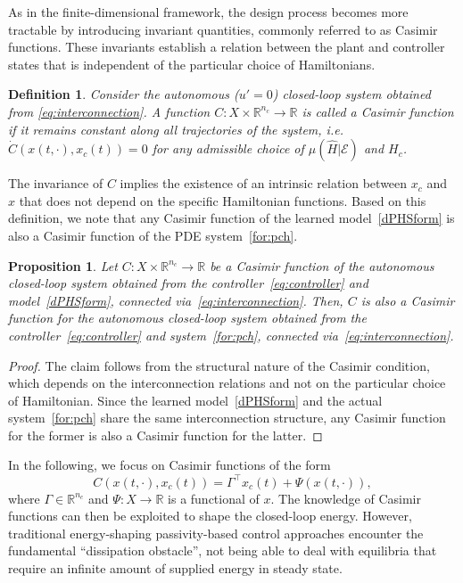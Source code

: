 \documentclass[letterpaper, 10 pt, conference]{ieeeconf}  %
\newcounter{part} %
\newtheorem{defn}{Definition}
\newtheorem{prop}{Proposition}
\begin{document}
As in the finite-dimensional framework, the design process becomes more tractable by introducing invariant quantities, commonly referred to as Casimir functions. These invariants establish a relation between the plant and controller states that is independent of the particular choice of Hamiltonians.

\begin{defn}
Consider the autonomous ($u' = 0$) closed-loop system obtained from \eqref{eq:interconnection}. A function $C \colon X \times \mathbb{R}^{n_c} \to \mathbb{R}$ is called a Casimir function if it remains constant along all trajectories of the system, i.e. $\dot{C}(x(t,\cdot), x_c(t)) = 0 $
for any admissible choice of $\mu(\hat{H}|\mathcal{E})$ and $H_c$.
\end{defn}


The invariance of $C$ implies the existence of an intrinsic relation between $x_c$ and $x$ that does not depend on the specific Hamiltonian functions. Based on this definition, we note that any Casimir function of the learned model~\cref{dPHSform} is also a Casimir function of the PDE system~\cref{for:pch}.
\begin{prop}\label{prop:1}
Let $C \colon X \times \mathbb{R}^{n_c} \to \mathbb{R}$ be a Casimir function of the autonomous closed-loop system obtained from the controller~\cref{eq:controller} and \textit{model}~\cref{dPHSform}, connected via~\eqref{eq:interconnection}. Then, $C$ is also a Casimir function for the autonomous closed-loop system obtained from the controller~\cref{eq:controller} and \textit{system}~\cref{for:pch}, connected via~\eqref{eq:interconnection}.
\end{prop}
\begin{proof}
The claim follows from the structural nature of the Casimir condition, which depends on the interconnection relations and not on the particular choice of Hamiltonian. Since the learned model~\cref{dPHSform} and the actual system~\cref{for:pch} share the same interconnection structure, any Casimir function for the former is also a Casimir function for the latter.
\end{proof}
In the following, we focus on Casimir functions of the form
\begin{equation}
C(x(t,\cdot), x_c(t)) = \Gamma^\top x_c(t) + \Psi(x(t,\cdot)),
\label{eq:casimir}
\end{equation}
where $\Gamma \in \mathbb{R}^{n_c}$ and $\Psi : X \to \mathbb{R}$ is a functional of $x$.
The knowledge of Casimir functions can then be exploited to shape the closed-loop energy. However, traditional energy-shaping passivity-based control approaches encounter the fundamental ``dissipation obstacle'', not being able to deal with equilibria that require an infinite amount of supplied energy in steady state.
\end{document}
